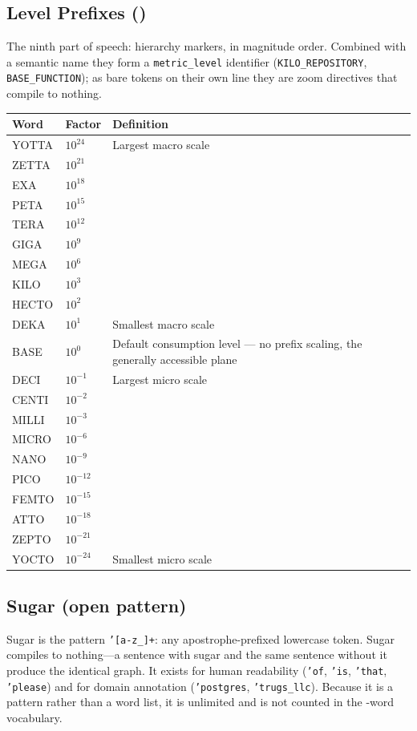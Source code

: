 \documentclass{article}
\begin{document}
\subsection{Level Prefixes (\VocabLevelPrefixes)}

The ninth part of speech: hierarchy markers, in magnitude order. Combined with a semantic name they form a \texttt{metric\_level} identifier (\texttt{KILO\_REPOSITORY}, \texttt{BASE\_FUNCTION}); as bare tokens on their own line they are zoom directives that compile to nothing.

\small
\begin{tabular}{llp{8cm}}
\toprule \textbf{Word} & \textbf{Factor} & \textbf{Definition} \\ \midrule
YOTTA & $10^{24}$ & Largest macro scale \\
ZETTA & $10^{21}$ &  \\
EXA & $10^{18}$ &  \\
PETA & $10^{15}$ &  \\
TERA & $10^{12}$ &  \\
GIGA & $10^{9}$ &  \\
MEGA & $10^{6}$ &  \\
KILO & $10^{3}$ &  \\
HECTO & $10^{2}$ &  \\
DEKA & $10^{1}$ & Smallest macro scale \\
BASE & $10^{0}$ & Default consumption level --- no prefix scaling, the generally accessible plane \\
DECI & $10^{-1}$ & Largest micro scale \\
CENTI & $10^{-2}$ &  \\
MILLI & $10^{-3}$ &  \\
MICRO & $10^{-6}$ &  \\
NANO & $10^{-9}$ &  \\
PICO & $10^{-12}$ &  \\
FEMTO & $10^{-15}$ &  \\
ATTO & $10^{-18}$ &  \\
ZEPTO & $10^{-21}$ &  \\
YOCTO & $10^{-24}$ & Smallest micro scale \\
\bottomrule
\end{tabular}
\normalsize

\subsection{Sugar (open pattern)}

Sugar is the pattern \texttt{'[a-z\_]+}: any apostrophe-prefixed lowercase token. Sugar compiles to nothing---a sentence with sugar and the same sentence without it produce the identical graph. It exists for human readability (\texttt{'of}, \texttt{'is}, \texttt{'that}, \texttt{'please}) and for domain annotation (\texttt{'postgres}, \texttt{'trugs\_llc}). Because it is a pattern rather than a word list, it is unlimited and is not counted in the \VocabTotal-word vocabulary.
\end{document}

